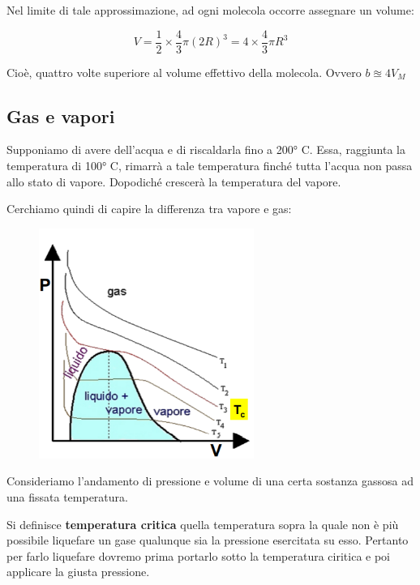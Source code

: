 \vspace{0.2cm}Nel limite di tale approssimazione, ad ogni molecola occorre assegnare un volume:

$$V = \frac{1}{2} \times \frac{4}{3}\pi (2R)^3 = 4 \times \frac{4}{3}\pi R^3$$

Cioè, quattro volte superiore al volume effettivo della molecola. Ovvero $b \approxeq 4V_M$
\subsection{Gas e vapori}
Supponiamo di avere dell'acqua e di riscaldarla fino a 200° C. Essa, raggiunta la temperatura di 100° C, rimarrà a tale temperatura finché tutta l'acqua non passa allo stato di vapore. Dopodiché crescerà la temperatura del vapore.

Cerchiamo quindi di capire la differenza tra vapore e gas:

\vspace{-0.4cm}

\hspace{1cm}\begin{minipage}{0.53 \textwidth}
    \begin{figure}[H]
        \includegraphics[width=7cm]{immagini/grafico_pV.png}
    \end{figure}
\end{minipage}
\begin{minipage}{0.4 \textwidth}
\vspace{0.6cm}Consideriamo l'andamento di pressione e volume di una certa sostanza gassosa ad una fissata temperatura.

\vspace{0.2cm}Si definisce \textbf{temperatura critica} quella temperatura sopra la quale non è più possibile liquefare un gase qualunque sia la pressione esercitata su esso. Pertanto per farlo liquefare dovremo prima portarlo sotto la temperatura ciritica e poi applicare la giusta pressione.
\end{minipage}

